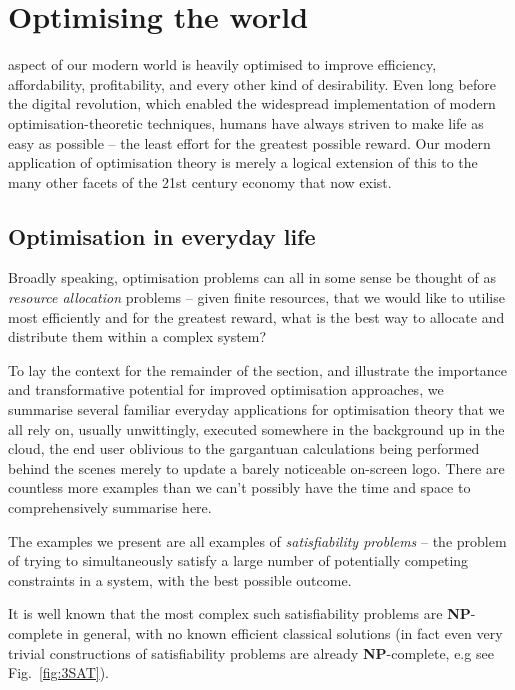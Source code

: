 %
%

\section{Optimising the world}\label{sec:optimising_the_world}

 aspect of our modern world is heavily optimised to improve efficiency, affordability, profitability, and every other kind of desirability. Even long before the digital revolution, which enabled the widespread implementation of modern optimisation-theoretic techniques, humans have always striven to make life as easy as possible -- the least effort for the greatest possible reward. Our modern application of optimisation theory is merely a logical extension of this to the many other facets of the 21st century economy that now exist.

\subsection{Optimisation in everyday life}

Broadly speaking, optimisation problems can all in some sense be thought of as \textit{resource allocation} problems -- given finite resources, that we would like to utilise most efficiently and for the greatest reward, what is the best way to allocate and distribute them within a complex system?

To lay the context for the remainder of the section, and illustrate the importance and transformative potential for improved optimisation approaches, we summarise several familiar everyday applications for optimisation theory that we all rely on, usually unwittingly, executed somewhere in the background up in the cloud, the end user oblivious to the gargantuan calculations being performed behind the scenes merely to update a barely noticeable on-screen logo. There are countless more examples than we can't possibly have the time and space to comprehensively summarise here.

The examples we present are all examples of \textit{satisfiability problems} -- the problem of trying to simultaneously satisfy a large number of potentially competing constraints in a system, with the best possible outcome.

It is well known that the most complex such satisfiability problems are \textbf{NP}-complete in general, with no known efficient classical solutions (in fact even very trivial constructions of satisfiability problems are already \textbf{NP}-complete, e.g see Fig.~\ref{fig:3SAT}).

